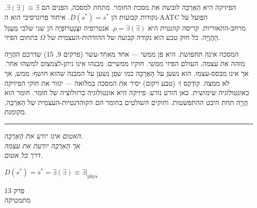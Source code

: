 \documentclass[10pt, openany, oneside]{book}
\renewcommand{\large}{\fontsize{11.5}{14}\selectfont}
\renewcommand{\huge}{\fontsize{17}{21}\selectfont}
\begin{document}
\noindent הפיזיקה היא הָאַרְכֵּה לובשת את מסכת החומר. מתחת למסכה, הפנים הם $\exists(\exists) \equiv \exists$. נקודות קבועות הן $D(s^*) = s^*$. איחוד פרוגרסיבי הוא ה-AATC הפועל על מרחב-התאוריות. קריסה קוונטית היא $\rho = \exists(\exists)$. אנטרופיה וצֶנְטְרוֹפְּיָה הן שני שלבי מַעְגַּל הַהֲוָיָה. כל חוק טבע הוא נקודה קבועה של ההזדהות-העצמית של $\Omega$ בתחום הפיזי.

המסכה אינה תחפושת. היא פן ממשי — אחד מאחד-עשר (פרקים 9, 15) שדרכם ההֲוָיָה מזהה את עצמה. העולם הפיזי ממשי. חוקיו ממשיים. מבנהו אינו ניתן-לצמצום למשהו אחר. אך אינו מבסס-עצמו. הוא נשען על הָאַרְכֵּה כמו שפן נשען על המבנה שהוא חושף: ממש, אך לא ממצה. קוֹדֶקְס ז׳ (טבע ויקום) יסיר את המסכה במלואה — יגזור את חוקי הפיזיקה כאונטולוגיה שימושית. כאן הזרע נזרע: פיזיקה היא אונטולוגיה ברזולוציה של חומר. חומר הוא הֲוָיָה תחת היבט ההתפשטות. וחוקים השולטים בחומר הם הקוהרנטיות-העצמית של הָאַרְכֵּה, מקומנת.

\vspace{2em}

\begin{center}
    \rule{0.15\textwidth}{0.3pt}
\end{center}

\vspace{0.5em}

\begin{center}
    \textit{%
    האטום אינו יודע את הָאַרְכֵּה.\\
    אך הָאַרְכֵּה יודעת את עצמה\\
    דרך כל אטום.}
\end{center}

\vspace{0.5em}

\begin{center}
    $D(s^*) = s^* = \exists(\exists) \equiv \exists|_{\text{phys}}$
\end{center}

%
%
%

\newpage

\begin{center}
    {\huge\textsc{פרק 13}}\\[0.3em]
    {\large\textsc{מתמטיקה}}
\end{center}

\vspace{1.5em}
\end{document}
